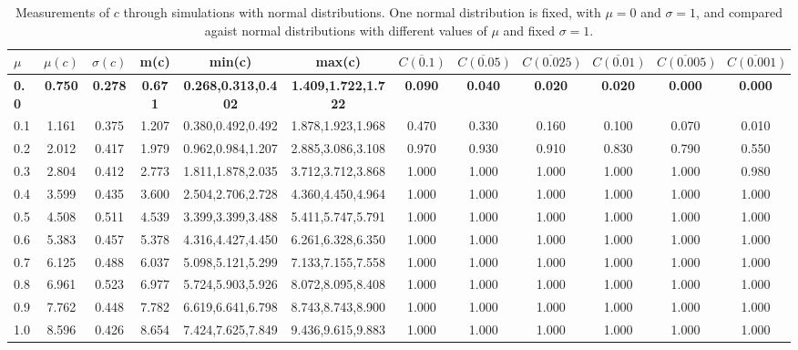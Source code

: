 \begin{table*}[h!]
\begin{center}
\begin{tabular}{| l | c | c | c | c | c | c | c | c | c | c | c |}\hline
$\mu$ & $\mu(c)$ & $\sigma(c)$ & m(c) & min(c) & max(c) & $\overline{C(0.1)}$ & $\overline{C(0.05)}$ & $\overline{C(0.025)}$ & $\overline{C(0.01)}$ & $\overline{C(0.005)}$ & $\overline{C(0.001)}$ \\\hline\hline
{\bf 0.0} & {\bf 0.750} & {\bf 0.278} & {\bf 0.671} & {\bf 0.268,0.313,0.402} & {\bf 1.409,1.722,1.722} & {\bf 0.090} & {\bf 0.040} & {\bf 0.020} & {\bf 0.020} & {\bf 0.000} & {\bf 0.000} \\\hline
0.1 & 1.161 & 0.375 & 1.207 & 0.380,0.492,0.492 & 1.878,1.923,1.968  & 0.470  & 0.330  & 0.160  & 0.100  & 0.070  & 0.010 \\\hline
0.2 & 2.012 & 0.417 & 1.979 & 0.962,0.984,1.207 & 2.885,3.086,3.108  & 0.970  & 0.930  & 0.910  & 0.830  & 0.790  & 0.550 \\\hline
0.3 & 2.804 & 0.412 & 2.773 & 1.811,1.878,2.035 & 3.712,3.712,3.868  & 1.000  & 1.000  & 1.000  & 1.000  & 1.000  & 0.980 \\\hline
0.4 & 3.599 & 0.435 & 3.600 & 2.504,2.706,2.728 & 4.360,4.450,4.964  & 1.000  & 1.000  & 1.000  & 1.000  & 1.000  & 1.000 \\\hline
0.5 & 4.508 & 0.511 & 4.539 & 3.399,3.399,3.488 & 5.411,5.747,5.791  & 1.000  & 1.000  & 1.000  & 1.000  & 1.000  & 1.000 \\\hline
0.6 & 5.383 & 0.457 & 5.378 & 4.316,4.427,4.450 & 6.261,6.328,6.350  & 1.000  & 1.000  & 1.000  & 1.000  & 1.000  & 1.000 \\\hline
0.7 & 6.125 & 0.488 & 6.037 & 5.098,5.121,5.299 & 7.133,7.155,7.558  & 1.000  & 1.000  & 1.000  & 1.000  & 1.000  & 1.000 \\\hline
0.8 & 6.961 & 0.523 & 6.977 & 5.724,5.903,5.926 & 8.072,8.095,8.408  & 1.000  & 1.000  & 1.000  & 1.000  & 1.000  & 1.000 \\\hline
0.9 & 7.762 & 0.448 & 7.782 & 6.619,6.641,6.798 & 8.743,8.743,8.900  & 1.000  & 1.000  & 1.000  & 1.000  & 1.000  & 1.000 \\\hline
1.0 & 8.596 & 0.426 & 8.654 & 7.424,7.625,7.849 & 9.436,9.615,9.883  & 1.000  & 1.000  & 1.000  & 1.000  & 1.000  & 1.000 \\\hline
\end{tabular}
\caption{Measurements of $c$ through simulations
with normal distributions.
One normal distribution is fixed, with $\mu=0$ and $\sigma=1$,
and compared agaist normal distributions with different values of $\mu$ and fixed $\sigma=1$.}
\end{center}
\end{table*}
